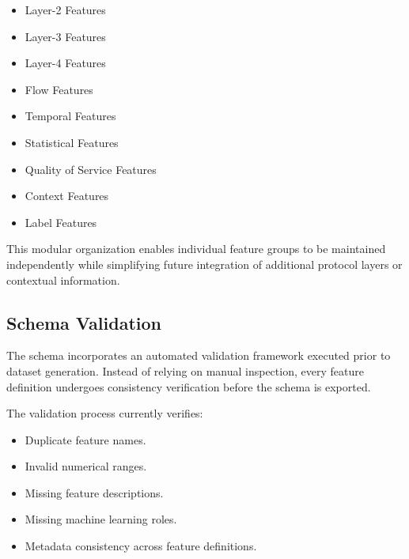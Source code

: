 \documentclass[12pt,a4paper]{article}
\begin{document}
\begin{itemize}
	
	\item Layer-2 Features
	
	\item Layer-3 Features
	
	\item Layer-4 Features
	
	\item Flow Features
	
	\item Temporal Features
	
	\item Statistical Features
	
	\item Quality of Service Features
	
	\item Context Features
	
	\item Label Features
	
\end{itemize}

This modular organization enables individual feature groups to be maintained independently while simplifying future integration of additional protocol layers or contextual information.

\subsection{Schema Validation}

The schema incorporates an automated validation framework executed prior to dataset generation. Instead of relying on manual inspection, every feature definition undergoes consistency verification before the schema is exported.

The validation process currently verifies:

\begin{itemize}
	
	\item Duplicate feature names.
	
	\item Invalid numerical ranges.
	
	\item Missing feature descriptions.
	
	\item Missing machine learning roles.
	
	\item Metadata consistency across feature definitions.
	
\end{itemize}
\end{document}
